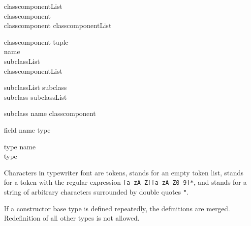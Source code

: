 \begin{production}{classcomponentList}
\emptystring \\
classcomponent \\
classcomponent \term{+} classcomponentList \\
\end{production}

\begin{production}{classcomponent}
\term{\{} tuple \term{\}} \\
name \\
subclassList \\
\term{(} classcomponentList \term{)} \\
\end{production}

\begin{production}{subclassList}
subclass \\
subclass \term{|} subclassList \\
\end{production}

\begin{production}{subclass}
name \term{:} classcomponent \\
\end{production}

\begin{production}{field}
name \term{:} type \\
\end{production}

\begin{production}{type}
name \\
\term{[} type \term{]} \\
\end{production}

Characters in typewriter font  are tokens,
{\emptystring} stands for an empty token list,
 stands for a token with the regular expression
\verb![a-zA-Z][a-zA-Z0-9]*!,
and  stands for a string of arbitrary characters
surrounded by double quotes \verb+"+.
\par
If a constructor base type is defined repeatedly, the definitions
are merged. Redefinition of all other types is not allowed.
